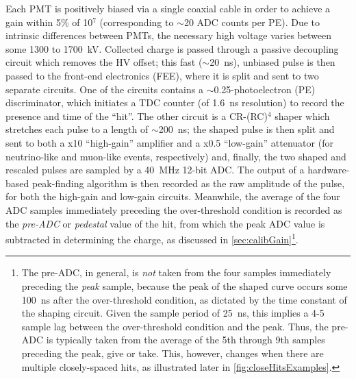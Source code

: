 \documentclass[../thesis.tex]{subfiles}
\begin{document}
Each PMT is positively biased via a single coaxial cable in order to achieve a
gain within 5\% of 10$^7$ (corresponding to $\sim$20 ADC counts per PE). Due to
intrinsic differences between PMTs, the necessary high voltage varies between
some 1300 to 1700~kV. Collected charge is passed through a passive decoupling
circuit which removes the HV offset; this fast ($\sim$20~ns), unbiased pulse is
then passed to the front-end electronics (FEE), where it is split and sent to
two separate circuits. One of the circuits contains a $\sim$0.25-photoelectron
(PE) discriminator, which initiates a TDC counter (of 1.6~ns resolution) to
record the presence and time of the ``hit''. The other circuit is a CR-(RC)$^4$
shaper which stretches each pulse to a length of $\sim$200~ns; the shaped pulse
is then split and sent to both a x10 ``high-gain'' amplifier and a x0.5
``low-gain'' attenuator (for neutrino-like and muon-like events, respectively)
and, finally, the two shaped and rescaled pulses are sampled by a 40~MHz 12-bit
ADC. The output of a hardware-based peak-finding algorithm is then recorded as
the raw amplitude of the pulse, for both the high-gain and low-gain
circuits. Meanwhile, the average of the four ADC samples immediately preceding
the over-threshold condition is recorded as the \emph{pre-ADC} or
\emph{pedestal} value of the hit, from which the peak ADC value is subtracted in
determining the charge, as discussed in \autoref{sec:calibGain}\footnote{The
  pre-ADC, in general, is \emph{not} taken from the four samples immediately
  preceding the \emph{peak} sample, because the peak of the shaped curve occurs
  some 100~ns after the over-threshold condition, as dictated by the time
  constant of the shaping circuit. Given the sample period of 25~ns, this
  implies a 4-5 sample lag between the over-threshold condition and the
  peak. Thus, the pre-ADC is typically taken from the average of the 5th through
  9th samples preceding the peak, give or take. This, however, changes when
  there are multiple closely-spaced hits, as illustrated later in
  \autoref{fig:closeHitsExamples}.}.
\end{document}
